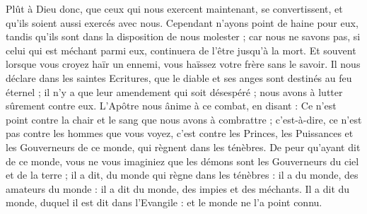 Plût à Dieu donc, que ceux qui nous exercent maintenant, se convertissent, et qu’ils soient aussi exercés avec nous. Cependant n’ayons point de haine pour eux, tandis qu’ils sont dans la disposition de nous molester ; car nous ne savons pas, si celui qui est méchant parmi eux, continuera de l’être jusqu’à la mort. Et souvent lorsque vous croyez haïr un ennemi, vous haïssez votre frère sans le savoir.
Il nous déclare dans les saintes Ecritures, que le diable et ses anges sont destinés au feu éternel ; il n’y a que leur amendement qui soit désespéré ; nous avons à lutter sûrement contre eux. L’Apôtre nous ânime à ce combat, en disant : Ce n’est point contre la chair et le sang que nous avons à combrattre ; c’est-à-dire, ce n’est pas contre les hommes que vous voyez, c’est contre les Princes, les Puissances et les Gouverneurs de ce monde, qui règnent dans les ténèbres.
De peur qu’ayant dit de ce monde, vous ne vous imaginiez que les démons sont les Gouverneurs du ciel et de la terre ; il a dit, du monde qui règne dans les ténèbres : il a du monde, des amateurs du monde : il a dit du monde, des impies et des méchants. Il a dit du monde, duquel il est dit dans l’Evangile : et le monde ne l’a point connu.